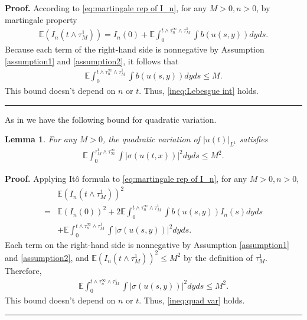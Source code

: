 \documentclass[12pt]{article}
\newtheorem{lemma}[theorem]{Lemma}
\newenvironment{proof}[1][Proof]{\noindent\textbf{#1.} }{\ \rule{0.5em}{0.5em}}
\numberwithin{equation}{section}
\begin{document}
\begin{proof}
According to \eqref{eq:martingale rep of I_n}, for any $M>0,n>0$, by martingale property
\begin{align}
    \mathbb{E}(I_n(t\land\tau_M^1))=I_n(0)+\mathbb{E}\int_0^{t\land\tau_n^\infty\land\tau_M^1}\int b(u(s,y))dyds.
\end{align}
Because each term of the right-hand side is nonnegative by Assumption \ref{assumption1} and \ref{assumption2}, it follows that
\begin{align}
     \mathbb{E}\int_0^{t\land\tau_n^\infty\land \tau_M^1}\int b(u(s,y))dyds\leq M.
\end{align}
This bound doesn't depend on $n$ or $t$. Thus, \eqref{ineq:Lebesgue int} holds.
\end{proof}

As in \cite{salins2025} we have the following bound for quadratic variation.
\begin{lemma}\label{lem:quad var}
    For any $M>0$, the quadratic variation of $|u(t)|_{L^1}$ satisfies
    \begin{align}
        \mathbb{E}\int_0^{\tau_M^1\land\tau_\infty^\infty}\int |\sigma(u(t,x))|^2dyds\leq M^2.\label{ineq:quad var}
    \end{align}
\end{lemma}
\begin{proof}
   Applying It\^{o} formula to \eqref{eq:martingale rep of I_n}, for any $M>0,n>0$,
   \begin{align}
       &\mathbb{E}(I_n(t\land\tau_M^1))^2 \nonumber\\
       =&\mathbb{E}(I_n(0))^2+2\mathbb{E}\int_0^{t\land\tau_n^\infty\land\tau_M^1}\int b(u(s,y))I_n(s)dyds\nonumber\\
       &+\mathbb{E}\int_0^{t\land\tau_n^\infty\land \tau_M^1}\int |\sigma(u(s,y))|^2dyds.
   \end{align}
   Each term on the right-hand side is nonnegative by Assumption \ref{assumption1} and \ref{assumption2}, and $\mathbb{E}(I_n(t\land\tau_M^1))^2\leq M^2$ by the definition of $\tau_M^1$. Therefore,
   \begin{align}
       \mathbb{E}\int_0^{t\land\tau_n^\infty\land \tau_M^1}\int |\sigma(u(s,y))|^2dyds\leq M^2.
   \end{align}
   This bound doesn't depend on $n$ or $t$. Thus, \eqref{ineq:quad var} holds.
\end{proof}
\end{document}
